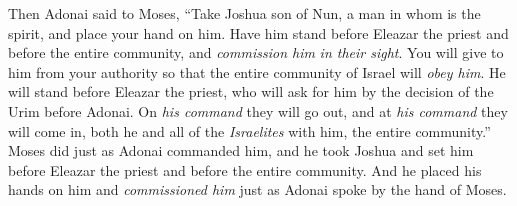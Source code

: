 \begin{biblechapter}
\verse Then Adonai said to Moses, “Take Joshua son of Nun, a man in whom is the spirit, and place your hand on him.
\verse Have him stand before Eleazar the priest and before the entire community, and \textit{commission him} \textit{in their sight}.
\verse You will give to him from your authority so that the entire community of Israel will \textit{obey him}.
\verse He will stand before Eleazar the priest, who will ask for him by the decision of the Urim before Adonai. On \textit{his command} they will go out, and at \textit{his command} they will come in, both he and all of the \textit{Israelites} with him, the entire community.”
\verse Moses did just as Adonai commanded him, and he took Joshua and set him before Eleazar the priest and before the entire community.
\verse And he placed his hands on him and \textit{commissioned him} just as Adonai spoke by the hand of Moses.
\end{biblechapter}

